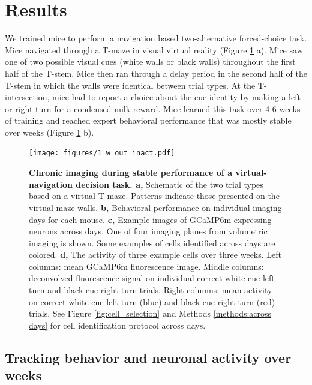 \section{Results} \label{sec:chap3_results}

We trained mice to perform a navigation based two-alternative forced-choice task. Mice navigated through a T-maze in visual virtual reality  \citep{Harvey:2012du} (Figure \ref{fig:1_w_out_inact} a). Mice saw one of two possible visual cues (white walls or black walls) throughout the first half of the T-stem. Mice then ran through a delay period in the second half of the T-stem in which the walls were identical between trial types. At the T-intersection, mice had to report a choice about the cue identity by making a left or right turn for a condensed milk reward. Mice learned this task over 4-6 weeks of training and reached expert behavioral performance that was mostly stable over weeks (Figure \ref{fig:1_w_out_inact} b). 

\begin{figure}
\texttt{[image: figures/1\_w\_out\_inact.pdf]}
\caption[Chronic imaging during stable performance of a virtual-navigation decision task.]{\textbf{Chronic imaging during stable performance of a virtual-navigation decision task. a,} Schematic of the two trial types based on a virtual T-maze. Patterns indicate those presented on the virtual maze walls.
%
\textbf{b,} Behavioral performance on individual imaging days for each mouse. 
%
\textbf{c,} Example images of GCaMP6m-expressing neurons across days. One of four imaging planes from volumetric imaging is shown. Some examples of cells identified across days are colored. 
%
\textbf{d,} The activity of three example cells over three weeks. Left columns: mean GCaMP6m fluorescence image. Middle columns: deconvolved fluorescence signal on individual correct white cue-left turn and black cue-right turn trials. Right columns: mean activity on correct white cue-left turn (blue) and black cue-right turn (red) trials. See Figure \ref{fig:cell_selection} and Methods \ref{methods:across days} for cell identification protocol across days. 
\label{fig:1_w_out_inact}}
\end{figure}

\subsection{Tracking behavior and neuronal activity over weeks} \label{sec:chap3_track_neuron_behavior}

